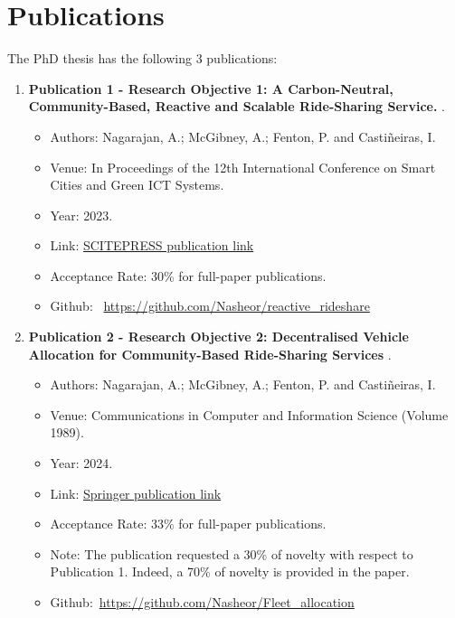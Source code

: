 \section{Publications}
\label{publications}
The PhD thesis has the following 3 publications:
\begin{enumerate}
    \item \textbf{Publication 1 - Research Objective 1: 
        A Carbon-Neutral, Community-Based, Reactive and Scalable Ride-Sharing Service.} \cite{smartgreens}.
         \begin{itemize}
             \item Authors: Nagarajan, A.; McGibney, A.; Fenton, P. and Castiñeiras, I.
             \item Venue: In Proceedings of the 12th International Conference on Smart
                   Cities and Green ICT Systems.
             \item Year: 2023.
             \item Link: \href{https://www.scitepress.org/PublicationsDetail.aspx?ID=tZN50XMYOaQ=&amp;t=1}{SCITEPRESS publication link}
             \item Acceptance Rate: 30\% for full-paper publications.
             \item Github: \ \url{https://github.com/Nasheor/reactive\_rideshare}   
         \end{itemize}

    \item \textbf{Publication 2 - Research Objective 2:
    Decentralised Vehicle Allocation for Community-Based Ride-Sharing Services} \cite{nagarajan2024decentralised}.
         \begin{itemize}
             \item Authors: Nagarajan, A.; McGibney, A.; Fenton, P. and Castiñeiras, I.
             \item Venue: Communications in Computer and Information Science (Volume 1989).
             \item Year: 2024.
             \item Link: \href{https://link.springer.com/chapter/10.1007/978-3-031-70966-1_2}{Springer publication link}
             \item Acceptance Rate: 33\% for full-paper publications.
             \item Note: The publication requested a 30\% of novelty with respect to Publication 1. Indeed, a 70\% of novelty is provided in the paper.
             \item Github:\ \url{https://github.com/Nasheor/Fleet_allocation}   
         \end{itemize}


\end{enumerate}
